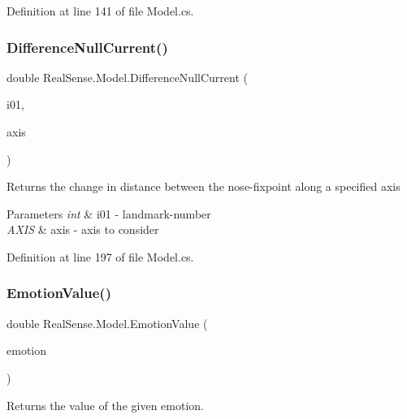 Definition at line 141 of file Model.\+cs.

\mbox{\label{class_real_sense_1_1_model_a69d8b360ed9c9ddaa19a0619df408e2a}} 
\subsubsection{\texorpdfstring{Difference\+Null\+Current()}{DifferenceNullCurrent()}}
{\footnotesize\ttfamily double Real\+Sense.\+Model.\+Difference\+Null\+Current (\begin{DoxyParamCaption}\item[{int}]{i01,  }\item[{\hyperlink{class_real_sense_1_1_model_ab1d8b9992dae2162c48b52f6694f946b}{A\+X\+IS}}]{axis }\end{DoxyParamCaption})}

Returns the change in distance between the nose-\/fixpoint along a specified axis 
\begin{DoxyParams}{Parameters}
{\em int} & i01 -\/ landmark-\/number \\
\hline
{\em A\+X\+IS} & axis -\/ axis to consider \\
\hline
\end{DoxyParams}


Definition at line 197 of file Model.\+cs.

\mbox{\label{class_real_sense_1_1_model_a078b1ddb43e777aa73c1b3898722e4bb}} 
\subsubsection{\texorpdfstring{Emotion\+Value()}{EmotionValue()}}
{\footnotesize\ttfamily double Real\+Sense.\+Model.\+Emotion\+Value (\begin{DoxyParamCaption}\item[{\hyperlink{class_real_sense_1_1_model_a5bf3fde8f53519f7a740d8b4e0399208}{Emotion}}]{emotion }\end{DoxyParamCaption})}

Returns the value of the given emotion.


